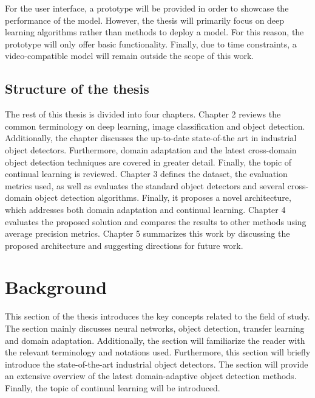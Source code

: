\documentclass[english, 12pt, a4paper, elec, utf8, a-1b, online]{aaltothesis}
\begin{document}
For the user interface, a prototype will be provided in order to showcase the performance of the model. However, the thesis will primarily focus on deep learning algorithms rather than methods to deploy a model. For this reason, the prototype will only offer basic functionality. Finally, due to time constraints, a video-compatible model will remain outside the scope of this work. 



\subsection{Structure of the thesis}
The rest of this thesis is divided into four chapters. Chapter 2 reviews the common terminology on deep learning, image classification and object detection. Additionally, the chapter discusses the up-to-date state-of-the art in industrial object detectors. Furthermore, domain adaptation and the latest cross-domain object detection techniques are covered in greater detail. Finally, the topic of continual learning is reviewed. Chapter 3 defines the dataset, the evaluation metrics used, as well as evaluates the standard object detectors and several cross-domain object detection algorithms. Finally, it proposes a novel architecture, which addresses both domain adaptation and continual learning. Chapter 4 evaluates the proposed solution and compares the results to other methods using average precision metrics. Chapter 5 summarizes this work by discussing the proposed architecture and suggesting directions for future work.

\clearpage
\section{Background}
This section of the thesis introduces the key concepts related to the field of study. The section mainly discusses neural networks, object detection, transfer learning and domain adaptation. Additionally, the section will familiarize the reader with the relevant terminology and notations used. Furthermore, this section will briefly introduce the state-of-the-art industrial object detectors. The section will provide an extensive overview of the latest domain-adaptive object detection methods. Finally, the topic of  continual learning will be introduced. 
\end{document}
